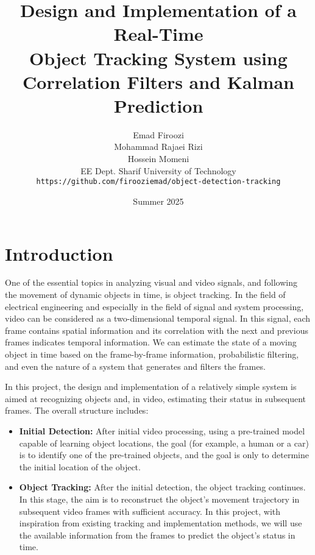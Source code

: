 \documentclass[12pt, a4paper]{article}
\title{
    \vspace{2cm}
    \textbf{Design and Implementation of a Real-Time \\ Object Tracking System using Correlation Filters and Kalman Prediction}
    \vspace{2cm}
}
\author{
    Emad Firoozi \\
    Mohammad Rajaei Rizi\\
    Hossein Momeni \\
    EE Dept. Sharif University of Technology \\
    \texttt{https://github.com/firooziemad/object-detection-tracking}
    \vspace{1cm}
}
\date{Summer 2025}
\begin{document}
\maketitle
\thispagestyle{empty}

\newpage

\tableofcontents

\newpage


\section{Introduction}

One of the essential topics in analyzing visual and video signals, and following the movement of dynamic objects in time, is object tracking. In the field of electrical engineering and especially in the field of signal and system processing, video can be considered as a two-dimensional temporal signal. In this signal, each frame contains spatial information and its correlation with the next and previous frames indicates temporal information. We can estimate the state of a moving object in time based on the frame-by-frame information, probabilistic filtering, and even the nature of a system that generates and filters the frames.

In this project, the design and implementation of a relatively simple system is aimed at recognizing objects and, in video, estimating their status in subsequent frames. The overall structure includes:

\begin{itemize}
    \item \textbf{Initial Detection:} After initial video processing, using a pre-trained model capable of learning object locations, the goal (for example, a human or a car) is to identify one of the pre-trained objects, and the goal is only to determine the initial location of the object.
    
    \item \textbf{Object Tracking:} After the initial detection, the object tracking continues. In this stage, the aim is to reconstruct the object's movement trajectory in subsequent video frames with sufficient accuracy. In this project, with inspiration from existing tracking and implementation methods, we will use the available information from the frames to predict the object's status in time.
\end{itemize}
\end{document}
